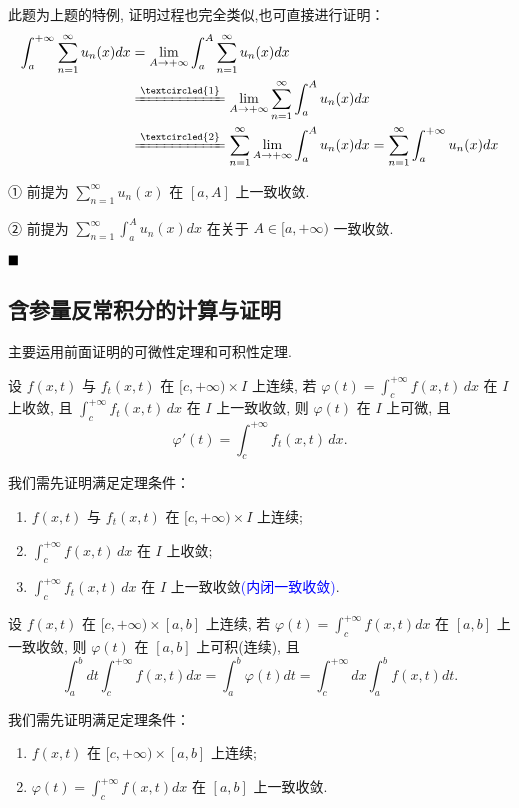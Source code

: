 \documentclass[lang=cn,newtx,10pt,scheme=chinese]{elegantbook}
\begin{document}
\begin{note}

此题为上题的特例, 证明过程也完全类似,也可直接进行证明：
\begin{align*}
\int_{a}^{+\infty} \sum_{n=1}^{\infty} u_n(x) dx &= \lim\limits_{A \to +\infty} \int_{a}^{A} \sum_{n=1}^{\infty} u_n(x) dx \\
&\xlongequal{\textcircled{1}} \lim\limits_{A \to +\infty} \sum_{n=1}^{\infty} \int_{a}^{A} u_n(x) dx \\
&\xlongequal{\textcircled{2}} \sum_{n=1}^{\infty} \lim\limits_{A \to +\infty} \int_{a}^{A} u_n(x) dx = \sum_{n=1}^{\infty} \int_{a}^{+\infty} u_n(x) dx
\end{align*}

① 前提为 $\sum_{n=1}^{\infty} u_n(x)$ 在 $[a, A]$ 上一致收敛.

② 前提为 $\sum_{n=1}^{\infty} \int_{a}^{A} u_n(x) dx$ 在关于 $A \in [a, +\infty)$ 一致收敛.

$\hfill \blacksquare$

\end{note}

\subsection{含参量反常积分的计算与证明}
主要运用前面证明的可微性定理和可积性定理.
\begin{theorem*}[可微性]
设 $f(x, t)$ 与 $f_t(x, t)$ 在 $[c, +\infty) \times I$ 上连续, 若 $\varphi(t) = \int_{c}^{+\infty} f(x, t) \,dx$ 在 $I$ 上收敛, 且 $\int_{c}^{+\infty} f_t(x, t) \,dx$ 在 $I$ 上一致收敛, 则 $\varphi(t)$ 在 $I$ 上可微, 且
$$
\varphi'(t) = \int_{c}^{+\infty} f_t(x, t) \,dx.
$$
\end{theorem*}

我们需先证明满足定理条件：
\begin{enumerate}
    \item $f(x, t)$ 与 $f_t(x, t)$ 在 $[c, +\infty) \times I$ 上连续;
    \item $\int_{c}^{+\infty} f(x, t) \,dx$ 在 $I$ 上收敛;
    \item $\int_{c}^{+\infty} f_t(x, t) \,dx$ 在 $I$ 上一致收敛\textcolor{blue}{(内闭一致收敛)}.
\end{enumerate}

\begin{theorem*}
设 $f(x, t)$ 在 $[c, +\infty) \times [a, b]$ 上连续, 若 $\varphi(t) = \int_{c}^{+\infty} f(x, t) dx$ 在 $[a, b]$ 上一致收敛, 则 $\varphi(t)$ 在 $[a, b]$ 上可积(连续), 且
$$ \int_{a}^{b} dt \int_{c}^{+\infty} f(x, t) dx = \int_{a}^{b} \varphi(t) dt = \int_{c}^{+\infty} dx \int_{a}^{b} f(x, t) dt. $$
\end{theorem*}
我们需先证明满足定理条件：
\begin{enumerate}
    \item $f(x, t)$ 在 $[c, +\infty) \times [a, b]$ 上连续;
    \item $\varphi(t) = \int_{c}^{+\infty} f(x, t) dx$ 在 $[a, b]$ 上一致收敛.
\end{enumerate}
\end{document}
